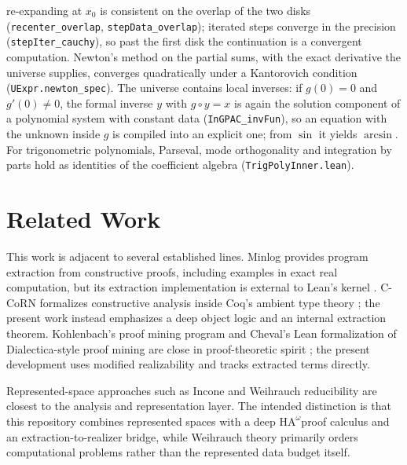 \documentclass[11pt,a4paper]{article}
\theoremstyle{definition}
\theoremstyle{remark}
\newcommand{\HAomega}{\ensuremath{\mathrm{HA}^{\omega}}}
\newcommand{\lean}[1]{\texttt{\nolinkurl{#1}}}
\begin{document}
\begin{itemize}
re-expanding at \(x_0\) is consistent on the overlap of the two disks
(\lean{recenter_overlap}, \lean{stepData_overlap}); iterated steps converge in
the precision (\lean{stepIter_cauchy}), so past the first disk the continuation
is a convergent computation. Newton's method on the partial sums, with the
exact derivative the universe supplies, converges quadratically under a
Kantorovich condition (\lean{UExpr.newton_spec}). The universe contains
local inverses: if \(g(0) = 0\) and \(g'(0) \ne 0\), the formal inverse
\(y\) with \(g\circ y = x\) is again the solution component of a polynomial
system with constant data (\lean{InGPAC_invFun}), so an equation with the
unknown inside \(g\) is compiled into an explicit one; from \(\sin\) it yields
\(\arcsin\). For trigonometric
polynomials, Parseval, mode orthogonality and integration by parts hold as
identities of the coefficient algebra (\lean{TrigPolyInner.lean}).
\end{itemize}

\section{Related Work}

This work is adjacent to several established lines.  Minlog provides program
extraction from constructive proofs, including examples in exact real
computation, but its extraction implementation is external to Lean's kernel
\cite{schwichtenberg2012,berger1998}.  C-CoRN formalizes constructive analysis
inside Coq's ambient type theory \cite{cruzfilipe2004}; the present work
instead emphasizes a deep object logic and an internal extraction theorem.
Kohlenbach's proof mining program and Cheval's Lean formalization of
Dialectica-style proof mining are close in proof-theoretic spirit
\cite{kohlenbach2008,cheval2023}; the present development uses modified
realizability and tracks extracted terms directly.

Represented-space approaches such as Incone \cite{steinberg2017,steinberg2022}
and Weihrauch reducibility \cite{weihrauch2000,brattka2021} are closest to the
analysis and representation layer.  The intended distinction is that this
repository combines represented spaces with a deep \HAomega proof calculus and
an extraction-to-realizer bridge, while Weihrauch theory primarily orders
computational problems rather than the represented data budget itself.
\end{document}
